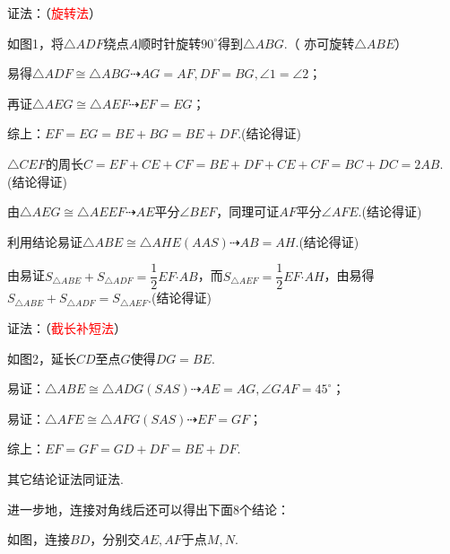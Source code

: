 {\kaishu\color{blue}
证法：（\textcolor{red}{旋转法}）

如图1，将$\triangle ADF$绕点$A$顺时针旋转$90^\circ$得到$\triangle ABG$.（ 亦可旋转$\triangle ABE$）

易得$\triangle ADF\cong \triangle ABG \dashrightarrow AG=AF,DF=BG,\angle 1=\angle 2$；

再证$\triangle AEG\cong \triangle AEF\dashrightarrow EF=EG$；

综上：$EF=EG=BE+BG=BE+DF$.(结论得证)

$\triangle CEF$的周长$C=EF+CE+CF=BE+DF+CE+CF=BC+DC=2AB$.(结论得证)

由$\triangle AEG\cong \triangle AEEF\dashrightarrow AE$平分$\angle BEF$，同理可证$AF$平分$\angle AFE$.(结论得证)

利用结论易证$\triangle ABE\cong \triangle AHE(AAS)\dashrightarrow AB=AH$.(结论得证)

由易证$S_{\triangle ABE}+S_{\triangle ADF}=\dfrac{1}{2}EF\bm\cdot AB$，而$S_{\triangle AEF}=\dfrac{1}{2}EF\bm\cdot AH$，由易得$S_{\triangle ABE}+S_{\triangle ADF}=S_{\triangle AEF}$.(结论得证)


证法：（\textcolor{red}{截长补短法}）

如图2，延长$CD$至点$G$使得$DG=BE$.

易证：$\triangle ABE\cong \triangle ADG(SAS)\dashrightarrow AE=AG,\angle GAF=45^\circ$；

易证：$\triangle AFE\cong \triangle AFG(SAS)\dashrightarrow EF=GF$；

综上：$EF=GF=GD+DF=BE+DF$.

其它结论证法同证法.}

进一步地，连接对角线后还可以得出下面8个结论：

如图，连接$BD$，分别交$AE,AF$于点$M,N$.

